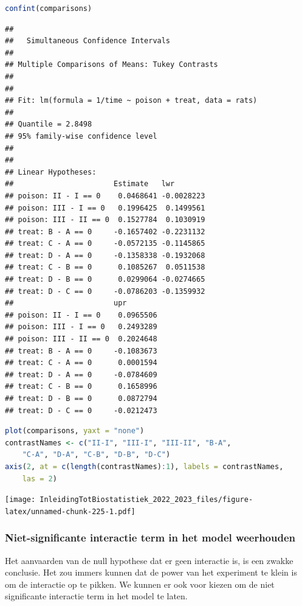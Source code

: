 \documentclass[
  12pt,dutch,coursenotes]{book}
\begin{document}
\begin{lstlisting}[language=R]
confint(comparisons)
\end{lstlisting}

\begin{lstlisting}
## 
##   Simultaneous Confidence Intervals
## 
## Multiple Comparisons of Means: Tukey Contrasts
## 
## 
## Fit: lm(formula = 1/time ~ poison + treat, data = rats)
## 
## Quantile = 2.8498
## 95% family-wise confidence level
##  
## 
## Linear Hypotheses:
##                       Estimate   lwr       
## poison: II - I == 0    0.0468641 -0.0028223
## poison: III - I == 0   0.1996425  0.1499561
## poison: III - II == 0  0.1527784  0.1030919
## treat: B - A == 0     -0.1657402 -0.2231132
## treat: C - A == 0     -0.0572135 -0.1145865
## treat: D - A == 0     -0.1358338 -0.1932068
## treat: C - B == 0      0.1085267  0.0511538
## treat: D - B == 0      0.0299064 -0.0274665
## treat: D - C == 0     -0.0786203 -0.1359932
##                       upr       
## poison: II - I == 0    0.0965506
## poison: III - I == 0   0.2493289
## poison: III - II == 0  0.2024648
## treat: B - A == 0     -0.1083673
## treat: C - A == 0      0.0001594
## treat: D - A == 0     -0.0784609
## treat: C - B == 0      0.1658996
## treat: D - B == 0      0.0872794
## treat: D - C == 0     -0.0212473
\end{lstlisting}

\begin{lstlisting}[language=R]
plot(comparisons, yaxt = "none")
contrastNames <- c("II-I", "III-I", "III-II", "B-A",
    "C-A", "D-A", "C-B", "D-B", "D-C")
axis(2, at = c(length(contrastNames):1), labels = contrastNames,
    las = 2)
\end{lstlisting}

\texttt{[image: InleidingTotBiostatistiek\_2022\_2023\_files/figure-latex/unnamed-chunk-225-1.pdf]}

\hypertarget{niet-significante-interactie-term-in-het-model-weerhouden}{%
\subsubsection{Niet-significante interactie term in het model weerhouden}\label{niet-significante-interactie-term-in-het-model-weerhouden}}

Het aanvaarden van de null hypothese dat er geen interactie is, is een zwakke conclusie.
Het zou immers kunnen dat de power van het experiment te klein is om de interactie op te pikken.
We kunnen er ook voor kiezen om de niet significante interactie term in het model te laten.
\end{document}
